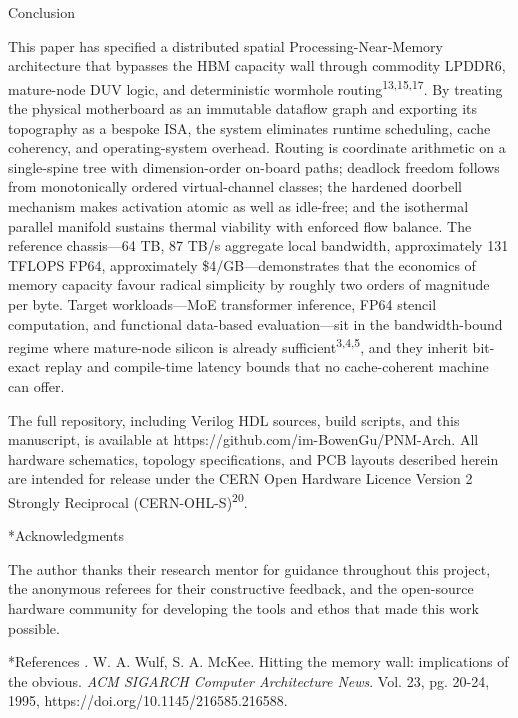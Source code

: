 \documentclass[12pt]{article}
\makeatletter
\renewcommand\section{\@startsection{section}{1}{\z@}{-1.2ex \@plus -0.2ex}{0.4ex}{\normalsize\bfseries}}
\makeatother
\begin{document}
Conclusion

This paper has specified a distributed spatial Processing-Near-Memory architecture that bypasses the HBM capacity wall through commodity LPDDR6, mature-node DUV logic, and deterministic wormhole routing\textsuperscript{13,15,17}. By treating the physical motherboard as an immutable dataflow graph and exporting its topography as a bespoke ISA, the system eliminates runtime scheduling, cache coherency, and operating-system overhead. Routing is coordinate arithmetic on a single-spine tree with dimension-order on-board paths; deadlock freedom follows from monotonically ordered virtual-channel classes; the hardened doorbell mechanism makes activation atomic as well as idle-free; and the isothermal parallel manifold sustains thermal viability with enforced flow balance. The reference chassis---64 TB, 87 TB/s aggregate local bandwidth, approximately 131 TFLOPS FP64, approximately \$4/GB---demonstrates that the economics of memory capacity favour radical simplicity by roughly two orders of magnitude per byte. Target workloads---MoE transformer inference, FP64 stencil computation, and functional data-based evaluation---sit in the bandwidth-bound regime where mature-node silicon is already sufficient\textsuperscript{3,4,5}, and they inherit bit-exact replay and compile-time latency bounds that no cache-coherent machine can offer.

The full repository, including Verilog HDL sources, build scripts, and this manuscript, is available at https://github.com/im-BowenGu/PNM-Arch. All hardware schematics, topology specifications, and PCB layouts described herein are intended for release under the CERN Open Hardware Licence Version 2 Strongly Reciprocal (CERN-OHL-S)\textsuperscript{20}.

\section*{Acknowledgments}

The author thanks their research mentor for guidance throughout this project, the anonymous referees for their constructive feedback, and the open-source hardware community for developing the tools and ethos that made this work possible.

\section*{References}
\begingroup
\footnotesize
\setlength{\parindent}{0pt}
\setlength{\parskip}{0.55em}
. W. A. Wulf, S. A. McKee. Hitting the memory wall: implications of the obvious. \textit{ACM SIGARCH Computer Architecture News}. Vol. 23, pg. 20-24, 1995, https:/\allowbreak{}/\allowbreak{}doi.org/\allowbreak{}10.1145/\allowbreak{}216585.216588.
\end{document}
